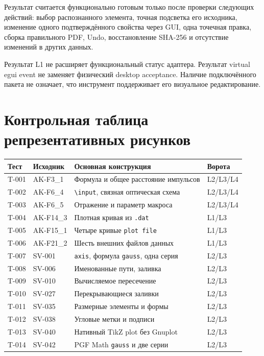 \documentclass[11pt,a4paper,oneside]{scrreprt}
\begin{document}
Результат считается функционально готовым только после проверки следующих действий: выбор распознанного элемента, точная подсветка его исходника, изменение одного подтверждённого свойства через GUI, одна точечная правка, сборка правильного PDF, Undo, восстановление SHA-256 и отсутствие изменений в других данных.

Результат L1 не расширяет функциональный статус адаптера. Результат virtual egui event не заменяет физический desktop acceptance. Наличие подключённого пакета не означает, что инструмент поддерживает его визуальное редактирование.

\section{Контрольная таблица репрезентативных рисунков}\label{ux43aux43eux43dux442ux440ux43eux43bux44cux43dux430ux44f-ux442ux430ux431ux43bux438ux446ux430-ux440ux435ux43fux440ux435ux437ux435ux43dux442ux430ux442ux438ux432ux43dux44bux445-ux440ux438ux441ux443ux43dux43aux43eux432}

\begin{longtable}[]{@{}llll@{}}
\toprule\noalign{}
Тест & Исходник & Основная конструкция & Ворота \\
\midrule\noalign{}
\endhead
\bottomrule\noalign{}
\endlastfoot
T-001 & AK-F3\_1 & Формула и общее расстояние импульсов & L2/L3/L4 \\
T-002 & AK-F6\_4 & \texttt{\textbackslash{}input}, связная оптическая схема & L2/L3/L4 \\
T-003 & AK-F6\_5 & Отражение и параметр макроса & L2/L3/L4 \\
T-004 & AK-F14\_3 & Плотная кривая из \texttt{.dat} & L1/L3 \\
T-005 & AK-F15\_1 & Четыре кривые \texttt{plot\ file} & L1/L3 \\
T-006 & AK-F21\_2 & Шесть внешних файлов данных & L1/L3 \\
T-007 & SV-001 & \texttt{axis}, формула \texttt{gauss}, одна серия & L2/L3 \\
T-008 & SV-006 & Именованные пути, заливка & L2/L3 \\
T-009 & SV-010 & Вычисляемое пересечение & L2/L3 \\
T-010 & SV-027 & Перекрывающиеся заливки & L2/L3 \\
T-011 & SV-035 & Размерные элементы и формы & L2/L3 \\
T-012 & SV-038 & Угловые метки и подписи & L2/L3 \\
T-013 & SV-040 & Нативный TikZ plot без Gnuplot & L2/L3 \\
T-014 & SV-042 & PGF Math \texttt{gauss} и две серии & L2/L3 \\
\end{longtable}
\end{document}
